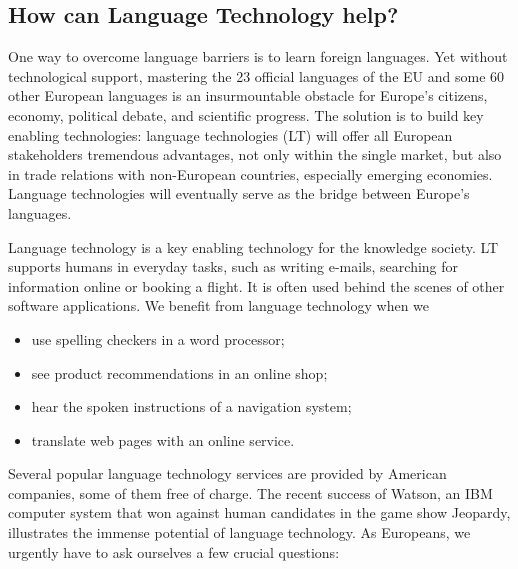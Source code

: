 \documentclass[10pt, plain]{../../metanetpaper}
\begin{document}
\begin{multicols}{2}
\subsection{How can Language Technology help?}
\label{sec:how-can-language-technology-help}

One way to overcome language barriers is to learn foreign languages. Yet without technological support, mastering the 23 official languages of the EU and some 60 other European languages is an insurmountable obstacle for Europe’s citizens, economy, political debate, and scientific progress. The solution is to build key enabling technologies: language technologies (LT) will offer all European stakeholders tremendous advantages, not only within the single market, but also in trade relations with non-European countries, especially emerging economies. Language technologies will eventually serve as the bridge between Europe’s languages.

Language technology is a key enabling technology for the knowledge society. LT supports humans in everyday tasks, such as writing e-mails, searching for information online or booking a flight. It is often used behind the scenes of other software applications. We benefit from language technology when we

\begin{itemize}
\item use spelling checkers in a word processor;
\item see product recommendations in an online shop;
\item hear the spoken instructions of a navigation system;
\item translate web pages with an online service. 
\end{itemize}

Several popular language technology services are provided by American companies, some of them free of charge. The recent success of Watson, an IBM computer system that won against human candidates in the game show Jeopardy, illustrates the immense potential of language technology. As Europeans, we urgently have to ask ourselves a few crucial questions:


\end{multicols}
\end{document}

